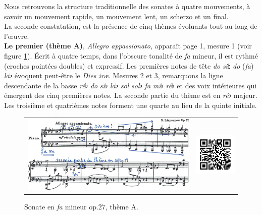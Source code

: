 Nous retrouvons la structure traditionnelle des sonates à quatre mouvements, à savoir un mouvement rapide, un mouvement lent, un scherzo et un final.\\

La seconde constatation, est la présence de cinq thèmes évoluants tout au long de l'œuvre.\\

\textbf{Le premier (thème A)}, \emph{Allegro appassionato}, apparaît page 1, mesure 1 (voir figure \ref{sonate-theme-1}). Écrit à quatre temps, dans l'obscure tonalité de \emph{fa} mineur, il est rythmé (croches pointées doubles) et expressif. Les premières notes de tête \emph{do} \emph{si}$\natural$ \emph{do} (\emph{fa}) \emph{la}$\flat$ évoquent peut-être le \emph{Dies iræ}. Mesures 2 et 3, remarquons la ligne descendante de la basse \emph{ré}$\flat$ \emph{do} \emph{si}$\flat$ \emph{la}$\flat$ \emph{sol} \emph{sol}$\flat$ \emph{fa} \emph{mi}$\flat$ \emph{ré}$\flat$ et des voix intérieures qui émergent des cinq premières notes. La seconde partie du thème est en \emph{ré}$\flat$ majeur. Les troisième et quatrièmes notes forment une quarte au lieu de la quinte initiale.

\begin{figure}[!ht]
  \begin{bigcenter}
    \vspace*{0.2cm}
    \begin{tabular}{lr}
      \includegraphics[width=12.5cm, keepaspectratio]{sonate-theme-A.png}
      &
      \includegraphics[width=3cm, keepaspectratio]{op1-qr.png}
    \end{tabular}
  \end{bigcenter}
  \caption{\label{sonate-theme-1}Sonate en \emph{fa} mineur op.27, thème A.}
\end{figure}

